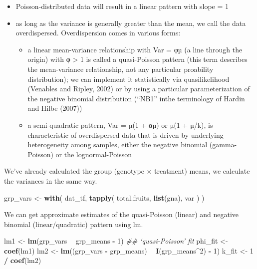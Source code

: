 \documentclass[
  12pt,
]{book}
\newenvironment{Shaded}{\begin{snugshade}}{\end{snugshade}}
\newcommand{\CommentTok}[1]{\textcolor[rgb]{0.56,0.35,0.01}{\textit{#1}}}
\newcommand{\DecValTok}[1]{\textcolor[rgb]{0.00,0.00,0.81}{#1}}
\newcommand{\KeywordTok}[1]{\textcolor[rgb]{0.13,0.29,0.53}{\textbf{#1}}}
\newcommand{\NormalTok}[1]{#1}
\newcommand{\OperatorTok}[1]{\textcolor[rgb]{0.81,0.36,0.00}{\textbf{#1}}}
\newcommand{\StringTok}[1]{\textcolor[rgb]{0.31,0.60,0.02}{#1}}
\providecommand{\tightlist}{%
  \setlength{\itemsep}{0pt}\setlength{\parskip}{0pt}}
\begin{document}
\begin{itemize}
\tightlist
\item
  Poisson-distributed data will result in a linear pattern with slope = 1
\item
  as long as the variance is generally greater than the mean, we call the data overdispersed. Overdispersion comes in various forms:

  \begin{itemize}
  \tightlist
  \item
    a linear mean-variance relationship with Var = φµ (a line through the origin) with φ \textgreater{} 1 is called a quasi-Poisson pattern (this term describes the mean-variance relationship, not any particular proability distribution); we can implement it statistically via quasilikelihood (Venables and Ripley, 2002) or by using a particular parameterization of the negative binomial distribution (``NB1'' inthe terminology of Hardin and Hilbe (2007))
  \item
    a semi-quadratic pattern, Var = µ(1 + αµ) or µ(1 + µ/k), is characteristic of overdispersed data that is driven by underlying heterogeneity among samples, either the negative binomial (gamma-Poisson) or the lognormal-Poisson \citep{elston2001}
  \end{itemize}
\end{itemize}

We've already calculated the group (genotype × treatment) means, we calculate the variances in the same way.

\begin{Shaded}
\begin{Highlighting}[]
\NormalTok{grp_vars <-}\StringTok{ }\KeywordTok{with}\NormalTok{(}
\NormalTok{  dat_tf,}
  \KeywordTok{tapply}\NormalTok{(}
\NormalTok{    total.fruits,}
    \KeywordTok{list}\NormalTok{(gna), var}
\NormalTok{  )}
\NormalTok{)}
\end{Highlighting}
\end{Shaded}

We can get approximate estimates of the quasi-Poisson (linear) and negative binomial (linear/quadratic) pattern using lm.

\begin{Shaded}
\begin{Highlighting}[]
\NormalTok{lm1 <-}\StringTok{ }\KeywordTok{lm}\NormalTok{(grp_vars }\OperatorTok{~}\StringTok{ }\NormalTok{grp_means }\OperatorTok{-}\StringTok{ }\DecValTok{1}\NormalTok{) }\CommentTok{## `quasi-Poisson' fit}
\NormalTok{phi_fit <-}\StringTok{ }\KeywordTok{coef}\NormalTok{(lm1)}
\NormalTok{lm2 <-}\StringTok{ }\KeywordTok{lm}\NormalTok{((grp_vars }\OperatorTok{-}\StringTok{ }\NormalTok{grp_means) }\OperatorTok{~}\StringTok{ }\KeywordTok{I}\NormalTok{(grp_means}\OperatorTok{^}\DecValTok{2}\NormalTok{) }\OperatorTok{-}\StringTok{ }\DecValTok{1}\NormalTok{)}
\NormalTok{k_fit <-}\StringTok{ }\DecValTok{1} \OperatorTok{/}\StringTok{ }\KeywordTok{coef}\NormalTok{(lm2)}
\end{Highlighting}
\end{Shaded}
\end{document}
